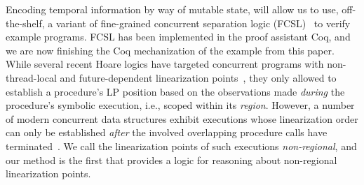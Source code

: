 Encoding temporal information by way of mutable state, will allow us
to use, off-the-shelf, a variant of fine-grained concurrent separation
logic (FCSL)~\cite{Sergey-al:ESOP15} to verify example programs.  FCSL
has been implemented in the proof assistant Coq, and we are now
finishing the Coq mechanization of the example from this paper. 
%
While several recent Hoare logics have targeted concurrent programs
with non-thread-local and future-dependent linearization
points~\cite{Liang-Feng:PLDI13,Turon-al:ICFP13}, they only allowed to
establish a procedure's LP position based on the observations made
\emph{during} the procedure's symbolic execution, i.e., scoped within
its \emph{region}.
%
However, a number of modern concurrent data structures exhibit
executions whose linearization order can only be established
\emph{after} the involved overlapping procedure calls have
terminated~\cite{Dodds-al:POPL15,Jayanti:STOC05}. We call the
linearization points of such executions \emph{non-regional}, and our
method is the first that provides a logic for reasoning about
non-regional linearization points.



